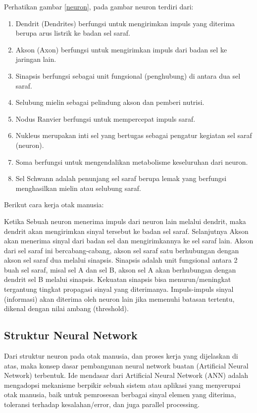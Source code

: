Perhatikan gambar \ref{neuron}, pada gambar neuron terdiri dari:

\begin{enumerate}
\item Dendrit (Dendrites) berfungsi untuk mengirimkan impuls yang diterima berupa arus listrik ke badan sel saraf.
\item Akson (Axon) berfungsi untuk mengirimkan impuls dari badan sel ke jaringan lain.
\item Sinapsis berfungsi sebagai unit fungsional (penghubung) di antara dua sel saraf.
\item Selubung mielin sebagai pelindung akson dan pemberi nutrisi.
\item Nodus Ranvier berfungsi untuk mempercepat impuls saraf.
\item Nukleus merupakan inti sel yang bertugas sebagai pengatur kegiatan sel saraf (neuron).
\item Soma berfungsi untuk mengendalikan metabolisme keseluruhan dari neuron.
\item Sel Schwann adalah penunjang sel saraf berupa lemak yang berfungsi menghasilkan mielin atau selubung saraf.
\end{enumerate}

Berikut cara kerja otak manusia:

Ketika Sebuah neuron menerima impuls dari neuron lain melalui dendrit, maka dendrit akan mengirimkan sinyal tersebut ke badan sel saraf. Selanjutnya Akson akan menerima sinyal dari badan sel dan mengirimkannya ke sel saraf lain. Akson dari sel saraf ini bercabang-cabang, akson sel saraf satu berhubungan dengan akson sel saraf dua melalui sinapsis. Sinapsis adalah unit fungsional antara 2 buah sel saraf, misal sel A dan sel B, akson sel A akan berhubungan dengan dendrit sel B melalui sinapsis. Kekuatan sinapsis bisa menurun/meningkat tergantung tingkat propagasi sinyal yang diterimanya. Impuls-impuls sinyal (informasi) akan diterima oleh neuron lain jika memenuhi batasan tertentu, dikenal dengan nilai ambang (threshold).

\subsection{Struktur Neural Network}
Dari struktur neuron pada otak manusia, dan proses kerja yang dijelaskan di atas, maka konsep dasar pembangunan neural network buatan (Artificial Neural Network) terbentuk. Ide mendasar dari Artificial Neural Network (ANN) adalah mengadopsi mekanisme berpikir sebuah sistem atau aplikasi yang menyerupai otak manusia, baik untuk pemrosesan berbagai sinyal elemen yang diterima, toleransi terhadap kesalahan/error, dan juga parallel processing.

